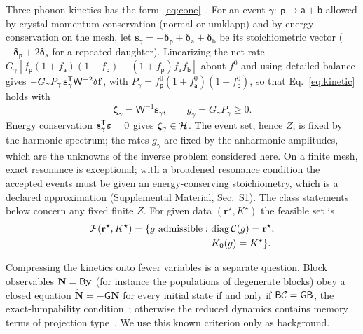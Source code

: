 Three-phonon kinetics has the form~\eqref{eq:cone}~\cite{Fugallo2013}. For an event
$\gamma:\ \mathsf p\to\mathsf a+\mathsf b$ allowed by crystal-momentum conservation (normal or umklapp)
and by energy conservation on the mesh, let $\mathbf s_\gamma=-\bm\delta_{\mathsf p}+\bm\delta_{\mathsf a}+\bm\delta_{\mathsf b}$
be its stoichiometric vector ($-\bm\delta_{\mathsf p}+2\bm\delta_{\mathsf a}$ for a repeated daughter).
Linearizing the net rate $G_\gamma[f_{\mathsf p}(1+f_{\mathsf a})(1+f_{\mathsf b})-(1+f_{\mathsf p})f_{\mathsf a}f_{\mathsf b}]$
about $f^0$ and using detailed balance gives $-G_\gamma P_\gamma\,\mathbf s_\gamma^{\mathsf T}\mathsf W^{-2}\delta\mathbf f$,
with $P_\gamma=f^0_{\mathsf p}(1+f^0_{\mathsf a})(1+f^0_{\mathsf b})$, so that Eq.~\eqref{eq:kinetic} holds
with
\begin{equation}
\bm\zeta_\gamma=\mathsf W^{-1}\mathbf s_\gamma,\qquad g_\gamma=G_\gamma P_\gamma\ge0 .
\label{eq:events}
\end{equation}
Energy conservation $\mathbf s_\gamma^{\mathsf T}\bm\varepsilon=0$ gives $\bm\zeta_\gamma\in\mathcal H$. The event set,
hence $Z$, is fixed by the harmonic spectrum; the rates $g_\gamma$ are fixed by the anharmonic
amplitudes, which are the unknowns of the inverse problem considered here. On a finite mesh, exact
resonance is exceptional; with a broadened resonance condition the accepted events must be given an
energy-conserving stoichiometry, which is a declared approximation (Supplemental Material, Sec.~S1).
The class statements below concern any fixed finite $Z$.
For given data $(\mathbf r^\star,K^\star)$ the feasible set is
\begin{equation}
\begin{split}
\mathcal F(\mathbf r^\star,K^\star)=\{g\ \text{admissible}:\ &\mathrm{diag}\,\Cop(g)=\mathbf r^\star,\\
&K_0(g)=K^\star\}.
\end{split}
\label{eq:feasible}
\end{equation}

Compressing the kinetics onto fewer variables is a separate question. Block observables
$\mathbf N=\mathsf B\mathbf y$ (for instance the populations of degenerate blocks) obey a closed equation
$\dot{\mathbf N}=-\mathsf G\mathbf N$ for every initial state if and only if $\mathsf B\mathcal C=\mathsf G\mathsf B$,
the exact-lumpability condition~\cite{WeiKuo1969,Aoki1968,LiRabitz1989,Buchholz1994}; otherwise the reduced
dynamics contains memory terms of projection type~\cite{Zwanzig1961,Mori1965}. We use this known
criterion only as background.
